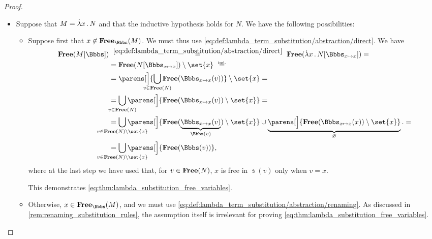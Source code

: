 \begin{proof}
\begin{itemize}
    \item Suppose that \( M = \qabs x N \) and that the inductive hypothesis holds for \( N \). We have the following possibilities:
    \begin{itemize}
      \item Suppose first that \( x \not\in \op*{Free}_\Bbbs(M) \). We must thus use \eqref{eq:def:lambda_term_substitution/abstraction/direct}. We have
      \begin{align*}
        \op*{Free}(M[\Bbbs])
        &\reloset{\eqref{eq:def:lambda_term_substitution/abstraction/direct}} =
        \op*{Free}(\qabs x N[\Bbbs_{x \mapsto x}])
        = \\ &=
        \op*{Free}(N[\Bbbs_{x \mapsto x}]) \setminus \set{ x }
        \reloset{\T{ind.}} = \\ &=
        \parens[\Big]{ \bigcup_{\mathclap{v \in \op*{Free}(N)}} \op*{Free}(\Bbbs_{x \mapsto x}(v)) } \setminus \set{ x }
        = \\ &=
        \bigcup_{\mathclap{v \in \op*{Free}(N)}} \parens[\Big]{ \op*{Free}(\Bbbs_{x \mapsto x}(v)) \setminus \set{ x } }
        = \\ &=
        \bigcup_{\mathclap{v \in \op*{Free}(N) \setminus \set{ x }}} \parens[\Big]{ \op*{Free}(\underbrace{\Bbbs_{x \mapsto x}(v)}_{\Bbbs(v)}) \setminus \set{ x } } \cup \underbrace{\parens[\Big]{ \op*{Free}(\Bbbs_{x \mapsto x}(x)) \setminus \set{ x } }}_\varnothing.
        = \\ &=
        \bigcup_{\mathclap{v \in \op*{Free}(N) \setminus \set{ x }}} \parens[\Big]{ \op*{Free}(\Bbbs(v)) },
      \end{align*}
      where at the last step we have used that, for \( v \in \op*{Free}(N) \), \( x \) is free in \( \Bbbs(v) \) only when \( v = x \).

      This demonstrates \eqref{eq:thm:lambda_substitution_free_variables}.

      \item Otherwise, \( x \in \op*{Free}_\Bbbs(M) \), and we must use \eqref{eq:def:lambda_term_substitution/abstraction/renaming}. As discussed in \cref{rem:renaming_substitution_rules}, the assumption itself is irrelevant for proving \eqref{eq:thm:lambda_substitution_free_variables}.


\end{itemize}
\end{itemize}
\end{proof}
